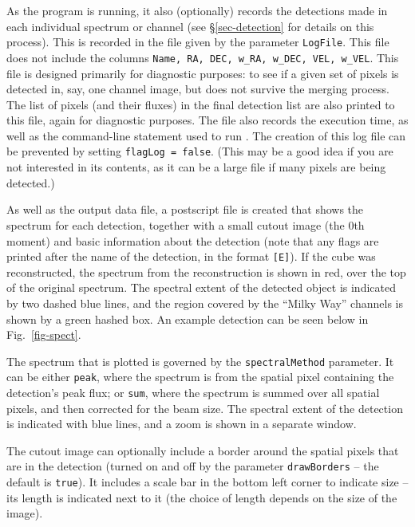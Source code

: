 As the program is running, it also (optionally) records the detections
made in each individual spectrum or channel (see \S\ref{sec-detection}
for details on this process). This is recorded in the file given by
the parameter \texttt{LogFile}. This file does not include the columns
\texttt{Name, RA, DEC, w\_RA, w\_DEC, VEL, w\_VEL}. This file is
designed primarily for diagnostic purposes: \eg to see if a given set
of pixels is detected in, say, one channel image, but does not survive
the merging process. The list of pixels (and their fluxes) in the
final detection list are also printed to this file, again for
diagnostic purposes. The file also records the execution time, as well
as the command-line statement used to run \duchamp. The creation of
this log file can be prevented by setting \texttt{flagLog =
false}. (This may be a good idea if you are not interested in its
contents, as it can be a large file if many pixels are being
detected.)


As well as the output data file, a postscript file is created that
shows the spectrum for each detection, together with a small cutout
image (the 0th moment) and basic information about the detection (note
that any flags are printed after the name of the detection, in the
format \texttt{[E]}). If the cube was reconstructed, the spectrum from
the reconstruction is shown in red, over the top of the original
spectrum. The spectral extent of the detected object is indicated by
two dashed blue lines, and the region covered by the ``Milky Way''
channels is shown by a green hashed box. An example detection can be
seen below in Fig.~\ref{fig-spect}.

The spectrum that is plotted is governed by the
\texttt{spectralMethod} parameter. It can be either \texttt{peak},
where the spectrum is from the spatial pixel containing the
detection's peak flux; or \texttt{sum}, where the spectrum is summed
over all spatial pixels, and then corrected for the beam size.  The
spectral extent of the detection is indicated with blue lines, and a
zoom is shown in a separate window.

The cutout image can optionally include a border around the spatial
pixels that are in the detection (turned on and off by the parameter
\texttt{drawBorders} -- the default is \texttt{true}). It includes a
scale bar in the bottom left corner to indicate size -- its length is
indicated next to it (the choice of length depends on the size of the
image).

